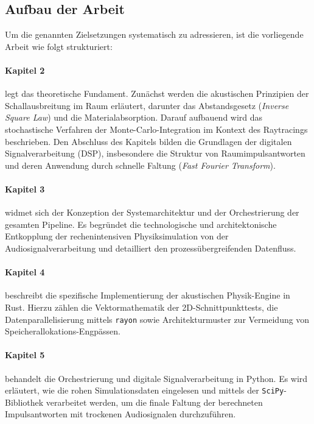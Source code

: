 \documentclass{article}
\begin{document}
    \subsection{Aufbau der Arbeit}
    \label{subsec:aufbau_der_arbeit}

    Um die genannten Zielsetzungen systematisch zu adressieren, ist die vorliegende Arbeit wie folgt strukturiert:

    \paragraph{Kapitel 2} legt das theoretische Fundament.
    Zunächst werden die akustischen Prinzipien der Schallausbreitung im Raum erläutert, darunter das Abstandsgesetz (\textit{Inverse Square Law}) und die Materialabsorption.
    Darauf aufbauend wird das stochastische Verfahren der Monte-Carlo-Integration im Kontext des Raytracings beschrieben.
    Den Abschluss des Kapitels bilden die Grundlagen der digitalen Signalverarbeitung (DSP), insbesondere die Struktur von Raumimpulsantworten und deren Anwendung durch schnelle Faltung
    (\textit{Fast Fourier Transform}).

    \paragraph{Kapitel 3} widmet sich der Konzeption der Systemarchitektur und der Orchestrierung der gesamten Pipeline.
    Es begründet die technologische und architektonische Entkopplung der rechenintensiven Physiksimulation von der Audiosignalverarbeitung und detailliert den prozessübergreifenden Datenfluss.

    \paragraph{Kapitel 4} beschreibt die spezifische Implementierung der akustischen Physik-Engine in Rust.
    Hierzu zählen die Vektormathematik der 2D-Schnittpunkttests, die Datenparallelisierung mittels \texttt{rayon} sowie Architekturmuster zur Vermeidung von Speicherallokations-Engpässen.

    \paragraph{Kapitel 5} behandelt die Orchestrierung und digitale Signalverarbeitung in Python.
    Es wird erläutert, wie die rohen Simulationsdaten eingelesen und mittels der \texttt{SciPy}-Bibliothek verarbeitet werden,
    um die finale Faltung der berechneten Impulsantworten mit trockenen Audiosignalen durchzuführen.
\end{document}
